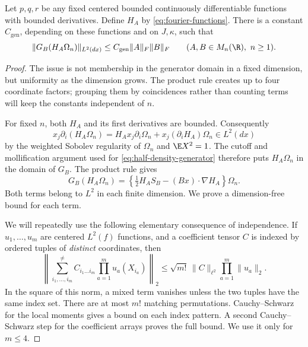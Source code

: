 \begin{lemma}
\label{lem:fourier-generator-bound}
Let $p,q,r$ be any fixed centered bounded continuously differentiable
functions with bounded derivatives.  Define $H_A$ by
\eqref{eq:fourier-functions}.  There is a constant $C_{\mathrm{gen}}$,
depending on these functions and on $J,\kappa$, such that
\begin{equation}
 \|G_B(H_A\Omega_n)\|_{L^2(dx)}
 \le C_{\mathrm{gen}}\|A\|_F\|B\|_F
 \qquad(A,B\in M_n(\R),\ n\ge1).
 \label{eq:coordinate-function-generator-bound}
\end{equation}
\end{lemma}

\begin{proof}
The issue is not membership in the generator domain in a fixed dimension, but
uniformity as the dimension grows.  The product rule creates up to four
coordinate factors; grouping them by coincidences rather than counting terms
will keep the constants independent of \(n\).

For fixed $n$, both $H_A$ and its first derivatives are bounded.
Consequently
\[
 x_j\partial_i(H_A\Omega_n)
 =H_Ax_j\partial_i\Omega_n
       +x_j(\partial_iH_A)\Omega_n\in L^2(dx)
\]
by the weighted Sobolev regularity of $\Omega_n$ and
$\E X^2=1$.  The cutoff and mollification argument used for
\eqref{eq:half-density-generator} therefore puts $H_A\Omega_n$
in the domain of $G_B$.
The product rule gives
\begin{equation}
 G_B(H_A\Omega_n)
 =\left\{\tfrac12H_AS_B-(Bx)\cdot\nabla H_A\right\}\Omega_n.
 \label{eq:coordinate-function-generator-product}
\end{equation}
Both terms belong to $L^2$ in each finite dimension.  We prove a
dimension-free bound for each term.

We will repeatedly use the following elementary consequence of
independence.  If $u_1,\ldots,u_m$ are centered $L^2(f)$ functions,
and a coefficient tensor $C$ is indexed by ordered tuples of
\emph{distinct} coordinates, then
\begin{equation}
 \left\|\sum_{i_1,\ldots,i_m}^{\ne}
 C_{i_1\ldots i_m}\prod_{a=1}^m u_a(X_{i_a})\right\|_2
 \le\sqrt{m!}\,\|C\|_{\ell^2}
                     \prod_{a=1}^m\|u_a\|_2.
 \label{eq:canonical-chaos-bound}
\end{equation}
In the square of this norm, a mixed term vanishes unless the two
tuples have the same index set.
There are at most $m!$ matching permutations.
Cauchy--Schwarz for the local moments gives a bound on each index
pattern.
A second Cauchy--Schwarz step for the coefficient arrays proves the
full bound.
We use it only for
$m\le4$.


\end{proof}
